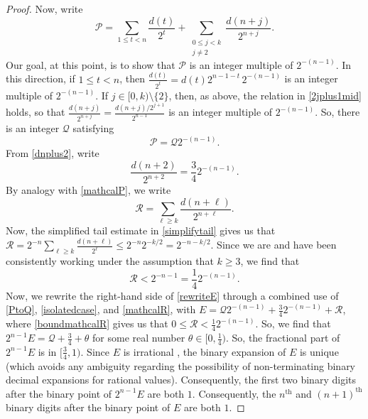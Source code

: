 \documentclass[12pt]{article}
\begin{document}
\begin{proof}
 Now, write 
\begin{equation}\label{mathcalP} 
 \mathcal{P} = \sum_{1 \leq t < n} \frac{d(t)}{2^t} 
 + \sum_{\substack{0 \leq j < k \\ j \neq 2}} \frac{d(n+j)}{2^{n+j}}. 
\end{equation}
 Our goal, at this point, is to show that $\mathcal{P}$ is an integer multiple of $2^{-(n-1)}$. In this direction, if $1 \leq t < n$, then 
 $ \frac{d(t)}{2^t} = d(t) 2^{n - 1 - t} \, 2^{-(n-1)} $ is an integer multiple of $2^{-(n-1)}$. If $j \in [0, k) \setminus \{2 \}$, then, as above, 
 the relation in \eqref{2jplus1mid} holds, so that $ \frac{d(n+j)}{2^{n+j}} = \frac{d(n+j)/2^{j+1} }{2^{n-1}} $ is an integer multiple of 
 $2^{-(n-1)}$. So, there is an integer $\mathcal{Q}$ satisfying
\begin{equation}\label{PtoQ} 
 \mathcal{P} = \mathcal{Q} 2^{-(n-1)}. 
\end{equation} 
 From \eqref{dnplus2}, write
\begin{equation}\label{isolatedcase} 
 \frac{d(n+2)}{2^{n+2}} = \frac{3}{4} 2^{-(n-1)}. 
\end{equation}
 By analogy with \eqref{mathcalP}, we write 
\begin{equation}\label{mathcalR}
 \mathcal{R} = \sum_{\ell \geq k} \frac{d(n + \ell)}{2^{n + \ell}}. 
\end{equation}
 Now, the simplified tail estimate in \eqref{simplifytail} gives us that $ \mathcal{R} = 2^{-n} \sum_{\ell \geq k} \frac{d(n + \ell)}{2^{\ell}} 
 \leq 2^{-n} 2^{-k/2} = 2^{-n-k/2}$. Since we are and have been consistently working under the assumption that $k \geq 3$, we 
 find that 
\begin{equation}\label{boundmathcalR}
 \mathcal{R} < 2^{-n-1} = \frac{1}{4} 2^{-(n-1)}. 
\end{equation}
 Now, we rewrite the right-hand side of \eqref{rewriteE} through a combined use of \eqref{PtoQ}, \eqref{isolatedcase}, and 
 \eqref{mathcalR}, with $ E = \mathcal{Q} 2^{-(n-1)} + \frac{3}{4} 2^{-(n-1)} + \mathcal{R}$, where \eqref{boundmathcalR} gives us that 
 $ 0 \leq \mathcal{R} < \frac{1}{4} 2^{-(n-1)}$. So, we find that $ 2^{n-1} E = \mathcal{Q} + \frac{3}{4} + \theta $ for some real number 
 $\theta \in \big[0, \frac{1}{4} \big)$. So, the fractional part of $2^{n-1} E$ is in 
 $\big[ \frac{3}{4}, 1 \big)$. Since $E$ is irrational \cite{Erdos1948}, the binary expansion of $E$ is unique 
 (which avoids any ambiguity regarding the possibility of non-terminating binary decimal expansions for rational values). 
 Consequently, the first two binary digits after the binary point of $2^{n-1}E$ are both $1$.
 Consequently, the $n^{\text{th}}$ and $(n+1)^{\text{th}}$ binary digits after the binary point of $E$ are both $1$. 


\end{proof}
\end{document}
